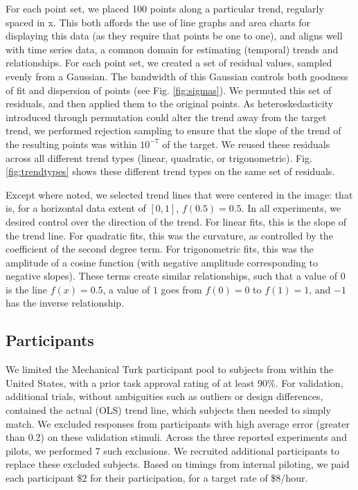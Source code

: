 \documentclass{sigchi}
\begin{document}
For each point set, we placed 100 points along a particular trend, regularly spaced in x. This both affords the use of line graphs and area charts for displaying this data (as they require that points be one to one), and aligns well with time series data, a common domain for estimating (temporal) trends and relationships. For each point set, we created a set of residual values, sampled evenly from a Gaussian. The bandwidth of this Gaussian controls both goodness of fit and dispersion of points (see Fig. \ref{fig:sigmas}). We permuted this set of residuals, and then applied them to the original points. As heteroskedasticity introduced through permutation could alter the trend away from the target trend, we performed rejection sampling to ensure that the slope of the trend of the resulting points was within $10^{-7}$ of the target. We reused these residuals across all different trend types (linear, quadratic, or trigonometric). Fig. \ref{fig:trendtypes} shows these different trend types on the same set of residuals.

Except where noted, we selected trend lines that were centered in the image: that is, for a horizontal data extent of $[0,1]$, $f(0.5) = 0.5$. In all experiments, we desired control over the direction of the trend. For linear fits, this is the slope of the trend line. For quadratic fits, this was the curvature, as controlled by the coefficient of the second degree term. For trigonometric fits, this was the amplitude of a cosine function (with negative amplitude corresponding to negative slopes). These terms create similar relationships, such that a value of $0$ is the line $f(x)=0.5$, a value of $1$ goes from $f(0)=0$ to $f(1)=1$, and $-1$ has the inverse relationship.

\subsection{Participants}

We limited the Mechanical Turk participant pool to subjects from within the United States, with a prior task approval rating of at least 90\%. For validation, additional trials, without ambiguities such as outliers or design differences, contained the actual (OLS) trend line, which subjects then needed to simply match.  We excluded responses from participants with high average error (greater than 0.2) on these validation stimuli. Across the three reported experiments and pilots, we performed 7 such exclusions. We recruited additional participants to replace these excluded subjects. Based on timings from internal piloting, we paid each participant \$2 for their participation, for a target rate of \$8/hour.
\end{document}
